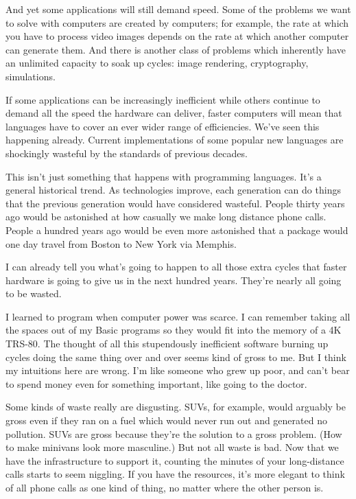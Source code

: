 And yet some applications will still demand speed. Some of the problems
we want to solve with computers are created by computers; for example,
the rate at which you have to process video images depends on the rate
at which another computer can generate them. And there is another class
of problems which inherently have an unlimited capacity to soak up
cycles: image rendering, cryptography, simulations.

If some applications can be increasingly inefficient while others
continue to demand all the speed the hardware can deliver, faster
computers will mean that languages have to cover an ever wider range of
efficiencies. We've seen this happening already. Current implementations
of some popular new languages are shockingly wasteful by the standards
of previous decades.

This isn't just something that happens with programming languages. It's
a general historical trend. As technologies improve, each generation can
do things that the previous generation would have considered wasteful.
People thirty years ago would be astonished at how casually we make long
distance phone calls. People a hundred years ago would be even more
astonished that a package would one day travel from Boston to New York
via Memphis.

I can already tell you what's going to happen to all those extra cycles
that faster hardware is going to give us in the next hundred years.
They're nearly all going to be wasted.

I learned to program when computer power was scarce. I can remember
taking all the spaces out of my Basic programs so they would fit into
the memory of a 4K TRS-80. The thought of all this stupendously
inefficient software burning up cycles doing the same thing over and
over seems kind of gross to me. But I think my intuitions here are
wrong. I'm like someone who grew up poor, and can't bear to spend money
even for something important, like going to the doctor.

Some kinds of waste really are disgusting. SUVs, for example, would
arguably be gross even if they ran on a fuel which would never run out
and generated no pollution. SUVs are gross because they're the solution
to a gross problem. (How to make minivans look more masculine.) But not
all waste is bad. Now that we have the infrastructure to support it,
counting the minutes of your long-distance calls starts to seem
niggling. If you have the resources, it's more elegant to think of all
phone calls as one kind of thing, no matter where the other person is.

